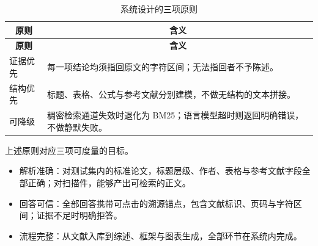 \documentclass[UTF8,fontset=windows,zihao=5,a4paper]{ctexart}
\begin{document}
\begin{longtable}{@{}p{}p{}@{}}
\caption{系统设计的三项原则}\\
\toprule
\multicolumn{1}{c}{\textbf{原则}} & \multicolumn{1}{c}{\textbf{含义}} \\
\midrule
\endfirsthead
\toprule
\multicolumn{1}{c}{\textbf{原则}} & \multicolumn{1}{c}{\textbf{含义}} \\
\midrule
\endhead
\bottomrule
\endfoot
证据优先 & 每一项结论均须指回原文的字符区间；无法指回者不予陈述。 \\
结构优先 & 标题、表格、公式与参考文献分别建模，不做无结构的文本拼接。 \\
可降级 & 稠密检索通道失效时退化为 BM25；语言模型超时则返回明确错误，不做静默失败。 \\
\end{longtable}

上述原则对应三项可度量的目标。

\begin{itemize}
\item 解析准确：对测试集内的标准论文，标题层级、作者、表格与参考文献字段全部正确；对扫描件，能够产出可检索的正文。
\item 回答可信：全部回答携带可点击的溯源锚点，包含文献标识、页码与字符区间；证据不足时明确拒答。
\item 流程完整：从文献入库到综述、框架与图表生成，全部环节在系统内完成。
\end{itemize}
\end{document}
